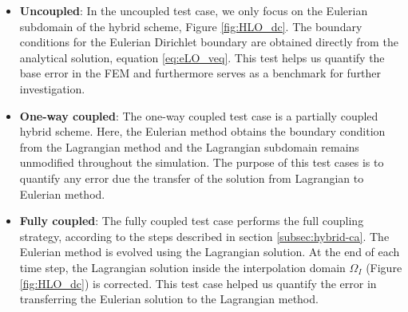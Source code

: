 \begin{itemize}
\item \textbf{Uncoupled}: In the uncoupled test case, we only focus on the Eulerian subdomain of the hybrid scheme, Figure \ref{fig:HLO_dc}. The boundary conditions for the Eulerian Dirichlet boundary are obtained directly from the analytical solution, equation \ref{eq:eLO_veq}. This test helps us quantify the base error in the FEM and furthermore serves as a benchmark for further investigation.
\item \textbf{One-way coupled}: The one-way coupled test case is a partially coupled hybrid scheme. Here, the Eulerian method obtains the boundary condition from the Lagrangian method and the Lagrangian subdomain remains unmodified throughout the simulation. The purpose of this test cases is to quantify any error due the transfer of the solution from Lagrangian to Eulerian method.
\item \textbf{Fully coupled}: The fully coupled test case performs the full coupling strategy, according to the steps described in section \ref{subsec:hybrid-ca}. The Eulerian method is evolved using the Lagrangian solution. At the end of each time step, the Lagrangian solution inside the interpolation domain $\Omega_{I}$ (Figure \ref{fig:HLO_dc}) is corrected. This test case helped us quantify the error in transferring the Eulerian solution to the Lagrangian method.
\end{itemize}
	
